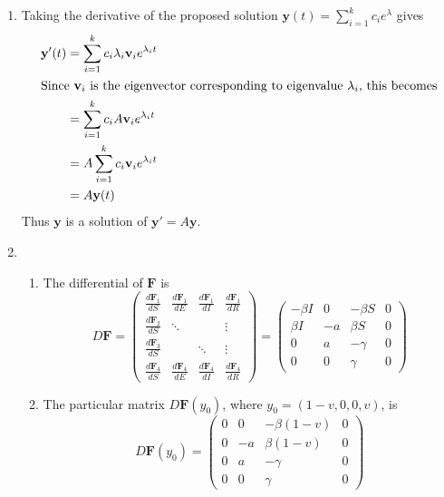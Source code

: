 \documentclass{article}
\begin{document}
\begin{enumerate}
	\item
		Taking the derivative of the proposed solution $\mathbf{y}(t) = \sum_{i=1}^{k} c_i e^{\lambda}$ gives
		\begin{align*}
			\mathbf{y}'(t) &= \sum_{i=1}^{k} c_i \lambda_i \mathbf{v}_i e^{\lambda_i t} \\
			\intertext{Since $\mathbf{v}_i$ is the eigenvector corresponding to eigenvalue $\lambda_i$, this becomes}
				       &= \sum_{i=1}^{k} c_i A \mathbf{v}_i e^{\lambda_i t} \\
				       &= A \sum_{i=1}^{k} c_i \mathbf{v}_i e^{\lambda_i t} \\
				       &= A \mathbf{y}(t)
		\end{align*}
		Thus $\mathbf{y}$ is a solution of $\mathbf{y}'=A\mathbf{y}$.
	
	\item 
	\begin{enumerate}
		\item
			The differential of $\mathbf{F}$ is
			\[
				D\mathbf{F}=
				\begin{pmatrix}
					\frac{d \mathbf{F}_1}{d S} & \frac{d \mathbf{F}_1}{d E} & \frac{d \mathbf{F}_1}{d I} & \frac{d \mathbf{F}_1}{d R} \\
					\frac{d \mathbf{F}_2}{d S} & \ddots & & \vdots \\
					\frac{d \mathbf{F}_3}{d S} & & \ddots & \vdots \\
					\frac{d \mathbf{F}_4}{d S} & \frac{d \mathbf{F}_4}{d E} & \frac{d \mathbf{F}_4}{d I} & \frac{d \mathbf{F}_4}{d R}
				\end{pmatrix}=
				\begin{pmatrix}
					-\beta I & 0 & -\beta S & 0 \\
					\beta I & -a & \beta S & 0 \\
					0 & a & -\gamma & 0 \\
					0 & 0 & \gamma & 0
				\end{pmatrix}
			\] 

		\item 
			The particular matrix $D \mathbf{F}(y_0)$, where $y_0=(1-v,0,0,v)$, is
			\[
				D\mathbf{F}(y_0) =
				\begin{pmatrix}
					0 & 0 & -\beta(1-v) & 0 \\
					0 & -a & \beta(1-v) & 0 \\
					0 & a & -\gamma & 0 \\
					0 & 0 & \gamma & 0
				\end{pmatrix}
			\] 


\end{enumerate}
\end{enumerate}
\end{document}

